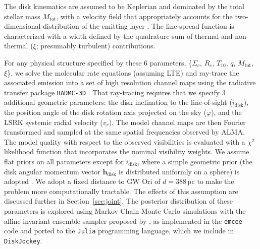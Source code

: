 \documentclass[twocolumn]{aastex61}
\begin{document}
The disk kinematics are assumed to be Keplerian and dominated by the total stellar mass $M_\mathrm{tot}$, with a velocity field that appropriately accounts for the two-dimensional distribution of the emitting layer \citep[see][]{rosenfeld13a}.  The  line-spread function is characterized with a width defined by the quadrature sum of thermal and non-thermal ($\xi$; presumably turbulent) contributions.

For any physical structure specified by these 6 parameters, \{$\Sigma_c$, $R_c$, $T_{10}$, $q$, $M_\mathrm{tot}$, $\xi$\}, we solve the molecular rate equations (assuming LTE) and ray-trace the associated emission into a set of high resolution channel maps using the radiative transfer package {\tt RADMC-3D} \citep{dullemond12}.  That ray-tracing requires that we specify 3 additional geometric parameters: the disk inclination to the line-of-sight ($i_\mathrm{disk}$), the position angle of the disk rotation axis projected on the sky ($\varphi$), and the LSRK systemic radial velocity ($v_r$).  The model channel maps are then Fourier transformed and sampled at the same spatial frequencies observed by ALMA.  The model quality with respect to the observed visibilities is evaluated with a $\chi^2$ likelihood function that incorporates the nominal visibility weights.
We assume flat priors on all parameters except for $i_\mathrm{disk}$, where a simple geometric prior (the disk angular momentum vector ${\bm h}_\mathrm{disk}$ is distributed uniformly on a sphere) is adopted \citep{czekala16}. We adopt a fixed distance to GW Ori of $d = 388\,$pc \citep{kounkel17} to make the problem more computationally tractable.  The effects of this assumption are discussed further in Section~\ref{sec:joint}. The posterior distribution of these parameters is explored using Markov Chain Monte Carlo simulations with the affine invariant ensemble sampler proposed by \citet{goodman10}, as implemented in the {\tt emcee} code \citep{foreman-mackey13} and ported to the {\tt Julia} programming language, which we include in {\tt DiskJockey}.
\end{document}
